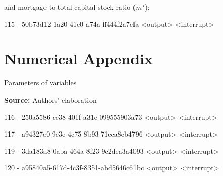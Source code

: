 \documentclass[11pt]{article}
\begin{document}
and mortgage to total capital stock ratio (\(m^{\star}\)):

115 - 50b73d12-1a20-41e0-a74a-ff444f2a7cfa <output> <interrupt>




\section{Numerical Appendix}
\label{sec:org8bd22fe}
\label{append:Data}

\begin{table}[H]
\caption{Parameters of variables}
\centering
\label{tab:param}

\caption*{\textbf{Source:} Authors' elaboration}
\end{table}


116 - 250a5586-ce38-401f-a31e-099555903a73 <output> <interrupt>


117 - a94327e0-9e3e-4c75-8b93-71eca8eb4796 <output> <interrupt>


119 - 3da183a8-0aba-464a-8f23-9c2dea3a4093 <output> <interrupt>


120 - a95840a5-617d-4c3f-8351-abd5646c61bc <output> <interrupt>
\end{document}
